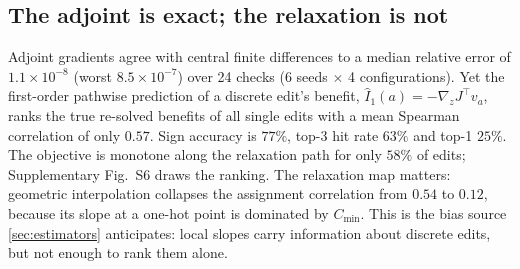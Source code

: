 \documentclass[journal]{IEEEtran}
\newcommand{\Jobj}{J}
\begin{document}
\subsection{The adjoint is exact; the relaxation is not}
\label{sec:e0}

Adjoint gradients agree with central finite differences to a median relative
error of $1.1\times10^{-8}$ (worst $8.5\times10^{-7}$) over 24 checks (6 seeds $\times$ 4 configurations).  Yet the first-order pathwise prediction of a discrete edit's benefit,
$\hat I_1(a)=-\nabla_z\Jobj^\top v_a$, ranks the true re-solved benefits of all single
edits with a mean Spearman correlation of only $0.57$.  Sign accuracy is $77\%$,
top-3 hit rate $63\%$ and top-1 $25\%$.  The objective is monotone along the
relaxation path for only $58\%$ of edits; Supplementary Fig.~S6 draws the ranking.  The relaxation map matters: geometric interpolation collapses the assignment
correlation from $0.54$ to $0.12$, because its slope at a one-hot point is dominated
by $C_{\min}$.
This is the bias source \cref{sec:estimators} anticipates: local slopes carry
information about discrete edits, but not enough to rank them alone.
\end{document}
